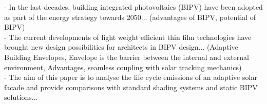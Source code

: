 
- In the last decades, building integrated photovoltaics (BIPV) have been adopted as part of the energy strategy towards 2050... (advantages of BIPV, potential of BIPV)\\

- The current developments of light weight efficient thin film technologies have brought new design possibilities for architects in BIPV design... (Adaptive Building Envelopes, Envelope is the barrier between the internal and external environment, Advantages, seamless coupling with solar tracking mechanics) \\

- The aim of this paper is to analyse the life cycle emissions of an adaptive solar facade and provide comparisons with standard shading systems and static BIPV solutions...\\